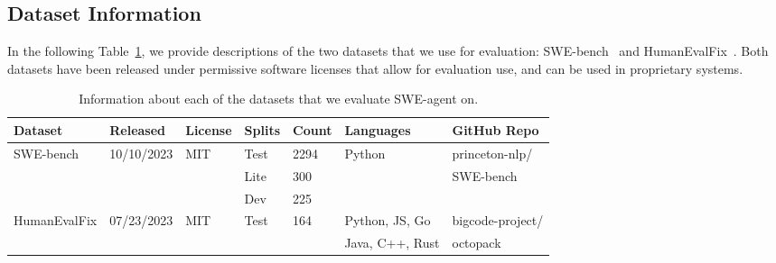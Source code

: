 \subsection{Dataset Information}
\label{appx:analyses:datasets_info}

In the following Table~\ref{tab:datasets_info}, we provide descriptions of the two datasets that we use for evaluation: SWE-bench~\citep{jimenez2024swebench} and HumanEvalFix~\citep{muennighoff2023octopack}.
Both datasets have been released under permissive software licenses that allow for evaluation use, and can be used in proprietary systems.

\begin{table}[ht]
    \caption{Information about each of the datasets that we evaluate SWE-agent on.}
    \label{tab:datasets_info}
    \vspace{0.25em}
    \centering
    \begin{tabular}{l|llllll}
        \toprule
         Dataset & Released & License & Splits & Count & Languages & GitHub Repo \\
         \midrule
         SWE-bench    & 10/10/2023 & MIT & Test & 2294 & Python          & princeton-nlp/ \\
                      &            &     & Lite & 300  &                 & SWE-bench\\
                      &            &     & Dev  & 225  &                 & \\
        \midrule
         HumanEvalFix & 07/23/2023 & MIT & Test & 164  & Python, JS, Go  & bigcode-project/ \\
                      &            &     &      &      & Java, C++, Rust & octopack\\
         \bottomrule
    \end{tabular}
\end{table}